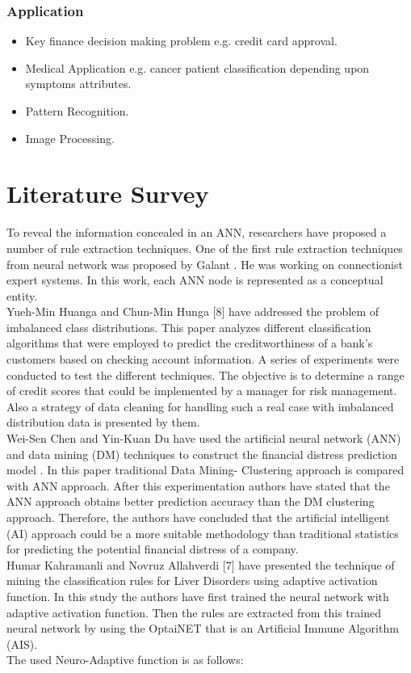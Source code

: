 \documentclass[a4paper,14pt,onecolumn]{article}
\begin{document}
\subsubsection{Application}

\begin{itemize}
\item Key finance decision making problem e.g. credit card approval.
\item Medical Application e.g. cancer patient classification depending upon symptoms attributes.
\item Pattern Recognition.
\item Image Processing.
\end{itemize}

\newpage
\section{Literature Survey}
          To reveal the information concealed in an ANN, researchers have proposed a number of rule extraction techniques. One of the first rule extraction techniques from neural network was proposed by Galant . He was working on connectionist expert systems. In this work, each ANN node is represented as a conceptual entity.\\
     Yueh-Min Huanga and  Chun-Min Hunga [8] have  addressed the problem of imbalanced class distributions. This paper analyzes different classification algorithms that were employed to predict the creditworthiness of a bank’s customers based on checking account information. A series of experiments were conducted to test the different techniques. The objective is to determine a range of credit scores that could be implemented by a manager for risk management. Also a strategy of data cleaning for handling such a real case with imbalanced distribution data is presented by them.\\
      Wei-Sen Chen  and Yin-Kuan Du  have used the artificial neural network (ANN) and data mining (DM) techniques to construct the financial distress prediction model . In this paper traditional Data Mining- Clustering approach is compared with ANN approach. After this experimentation authors have stated that the ANN approach obtains better prediction accuracy than the DM clustering approach. Therefore, the authors have concluded that the artificial intelligent (AI) approach could be a more suitable methodology than traditional statistics for predicting the potential financial distress of a company.\\
      Humar Kahramanli and  Novruz Allahverdi [7] have presented the technique of mining the classification rules for Liver Disorders using adaptive activation function. In this study the authors have first trained the neural network with adaptive activation function. Then the rules are extracted from this trained neural network by using the OptaiNET that is an Artificial Immune Algorithm (AIS).\\
    The used Neuro-Adaptive function is as follows:\\
\end{document}

